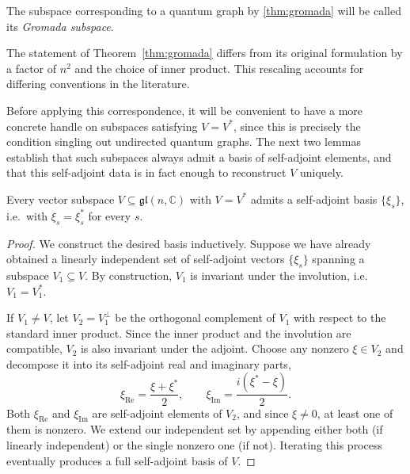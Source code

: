 \begin{def}
    \label{def:gromada-subspace}
    The subspace corresponding to a quantum graph by
    \ref{thm:gromada} will be called its
    \emph{Gromada subspace}.
\end{def}

\begin{remark}
    The statement of Theorem~\ref{thm:gromada} differs from its
    original formulation by a factor of \( n^2 \) and the choice of inner
    product. This rescaling accounts for differing conventions in the
    literature.
\end{remark}

Before applying this correspondence, it will be convenient to have a
more concrete handle on subspaces satisfying \( V = V^* \), since this
is precisely the condition singling out undirected quantum graphs. The
next two lemmas establish that such subspaces always admit a basis of
self-adjoint elements, and that this self-adjoint data is in fact
enough to reconstruct \( V \) uniquely.

\begin{lemma}
    \label{lem:self-adjoint-basis}
    Every vector subspace \( V \subseteq \mathfrak{gl}(n, \mathbb{C}) \) with
    \( V = V^* \) admits a self-adjoint basis \( \{\xi_s\} \), i.e.\ with
    \( \xi_s = \xi_s^* \) for every \( s \).
\end{lemma}

\begin{proof}
    We construct the desired basis inductively. Suppose we have already
    obtained a linearly independent set of self-adjoint vectors
    \( \{\xi_s\} \) spanning a subspace \( V_1 \subseteq V \). By
    construction, \( V_1 \) is invariant under the involution, i.e.\
    \( V_1 = V_1^* \).

    If \( V_1 \neq V \), let \( V_2 = V_1^\perp \) be the orthogonal
    complement of \( V_1 \) with respect to the standard inner
    product. Since the inner product and the involution are
    compatible, \( V_2 \) is also invariant under the adjoint.
    Choose any nonzero \( \xi \in V_2 \) and decompose it into its
    self-adjoint real and imaginary parts,
    \[
        \xi_{\mathrm{Re}} = \frac{\xi + \xi^*}{2}, \qquad
        \xi_{\mathrm{Im}} = \frac{i(\xi^* - \xi)}{2}.
    \]
    Both \( \xi_{\mathrm{Re}} \) and \( \xi_{\mathrm{Im}} \) are
    self-adjoint elements of \( V_2 \), and since \( \xi \neq 0 \), at
    least one of them is nonzero. We extend our independent set by
    appending either both (if linearly independent) or the single
    nonzero one (if not). Iterating this process eventually produces a
    full self-adjoint basis of \( V \).
\end{proof}

